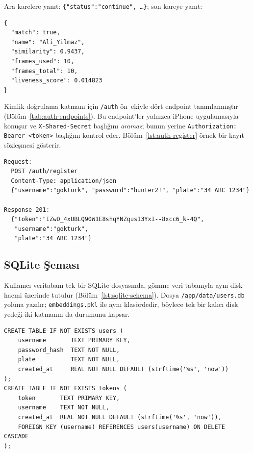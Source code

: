Ara karelere yanıt: \texttt{\{"status":"continue", \ldots\}}; son kareye
yanıt:

\begin{lstlisting}[language=none, caption={Son kareye sunucu yanıt örneği.}, label=lst:final-response]
{
  "match": true,
  "name": "Ali_Yilmaz",
  "similarity": 0.9437,
  "frames_used": 10,
  "frames_total": 10,
  "liveness_score": 0.014823
}
\end{lstlisting}

Kimlik doğrulama katmanı için \texttt{/auth} ön~ekiyle dört endpoint
tanımlanmıştır (Bölüm~\ref{tab:auth-endpoints}). Bu endpoint'ler yalnızca
iPhone uygulamasıyla konuşur ve \texttt{X-Shared-Secret} başlığını
\emph{aramaz}; bunun yerine \texttt{Authorization: Bearer <token>}
başlığını kontrol eder. Bölüm~\ref{lst:auth-register} örnek bir kayıt
sözleşmesi gösterir.

\begin{lstlisting}[language=none, caption={Yeni kullanıcı kaydı (\texttt{POST /auth/register}).}, label=lst:auth-register]
Request:
  POST /auth/register
  Content-Type: application/json
  {"username":"gokturk", "password":"hunter2!", "plate":"34 ABC 1234"}

Response 201:
  {"token":"IZwD_4xUBLQ90W1E8shqYNZqus13YxI--8xcc6_k-4Q",
   "username":"gokturk",
   "plate":"34 ABC 1234"}
\end{lstlisting}

\subsection{SQLite Şeması}

Kullanıcı veritabanı tek bir SQLite dosyasında, gömme veri tabanıyla aynı
disk hacmi üzerinde tutulur (Bölüm~\ref{lst:sqlite-schema}). Dosya
\texttt{/app/data/users.db} yoluna yazılır; \texttt{embeddings.pkl} ile
aynı klasördedir, böylece tek bir kalıcı disk yedeği iki katmanın da
durumunu kapsar.

\begin{lstlisting}[language=none, caption={Kullanıcı veritabanı şeması.}, label=lst:sqlite-schema]
CREATE TABLE IF NOT EXISTS users (
    username       TEXT PRIMARY KEY,
    password_hash  TEXT NOT NULL,
    plate          TEXT NOT NULL,
    created_at     REAL NOT NULL DEFAULT (strftime('%s', 'now'))
);
CREATE TABLE IF NOT EXISTS tokens (
    token       TEXT PRIMARY KEY,
    username    TEXT NOT NULL,
    created_at  REAL NOT NULL DEFAULT (strftime('%s', 'now')),
    FOREIGN KEY (username) REFERENCES users(username) ON DELETE CASCADE
);
\end{lstlisting}

